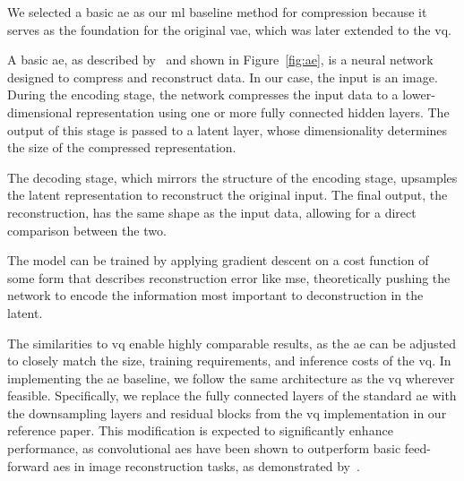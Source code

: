 We selected a basic \ac{ae} as our \ac{ml} baseline method for compression because it serves as the foundation
for the original \ac{vae}, which was later extended to the \ac{vq}.

A basic \ac{ae}, as described by~\cite{autoenc} and shown in Figure~\ref{fig:ae}, is a neural network designed to compress and reconstruct data. In our case, the input is an image. During the encoding stage, the network compresses the input data to a lower-dimensional representation using one or more fully connected hidden layers.
The output of this stage is passed to a latent layer, whose dimensionality determines the size of the compressed representation.

The decoding stage, which mirrors the structure of the encoding stage, upsamples the latent representation to reconstruct the original input.
The final output, the reconstruction, has the same shape as the input data, allowing for a direct comparison between the two.

The model can be trained by applying gradient descent on a cost function of some form that describes reconstruction error
like \ac{mse}, theoretically pushing the network to encode the information most important to deconstruction in the
latent.

The similarities to \ac{vq} enable highly comparable results, as the \ac{ae} can be adjusted to closely match the
size, training requirements, and inference costs of the \ac{vq}.
In implementing the \ac{ae} baseline, we follow the same architecture as the \ac{vq} wherever feasible.
Specifically, we replace the fully connected layers of the standard \ac{ae} with the downsampling layers and
residual blocks from the \ac{vq} implementation in our reference paper.
This modification is expected to significantly enhance performance, as convolutional \ac{ae}s have been shown to
outperform basic feed-forward \ac{ae}s in image reconstruction tasks, as demonstrated by~\cite{convae}.

